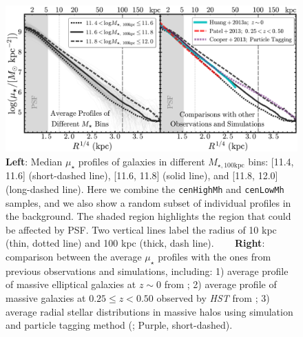 \documentclass[a4paper,fleqn,usenatbib]{mnras}
\def\rbcg{\texttt{cenHighMh}}
\def\nbcg{\texttt{cenLowMh}}
\def\mtot{{$M_{\star,100\mathrm{kpc}}$}}
\def\mden{{$\mu_{\star}$}}
\begin{document}
  \begin{figure}
      \centering 
      \includegraphics[width=\textwidth]{fig/average_mass_profiles_fsps1_A}
      \caption{
          \textbf{Left}: Median \mden{} profiles of galaxies in different \mtot{} bins:
      	  [11.4, 11.6] (short-dashed line), [11.6, 11.8] (solid line), and 
      	  [11.8, 12.0] (long-dashed line). 
      	  Here we combine the \rbcg{} and \nbcg{} samples, and we also show a random 
      	  subset of individual profiles in the background.
      	  The shaded region highlights the region that could be affected by PSF.
          Two vertical lines label the radius of 10 kpc (thin, dotted line) and
          100 kpc (thick, dash line). ~~~ 
          \textbf{Right}: comparison between the average \mden{} profiles with the ones 
          from previous observations and simulations, including: 
          1) average profile of massive elliptical galaxies at $z\sim 0$ from 
          \citet[][Cyan, solid]{Huang2013a}; 
          2) average profile of massive galaxies at $0.25 \leq z < 0.50$ observed by 
          \textit{HST} from \citet[][Red, long-dashed]{Patel2013} ;
          3) average radial stellar distributions in massive halos using simulation and 
          particle tagging method (\citealt{Cooper13}; Purple, short-dashed).
          }
      \label{fig:avg_prof}
  \end{figure}
\end{document}

